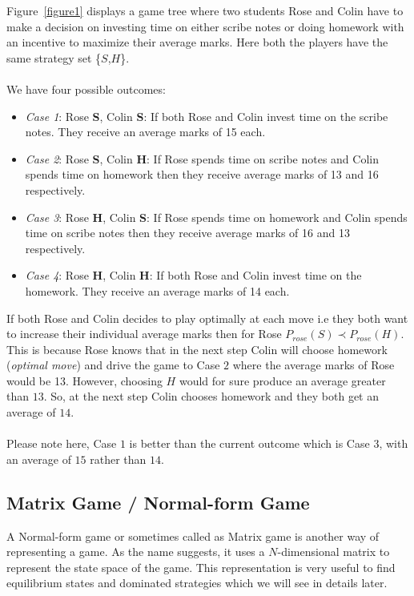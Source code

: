 Figure~\ref{figure1} displays a game tree where two students Rose and Colin have to make a decision on investing time on either scribe notes or doing homework with an incentive to maximize their average marks. Here both the players have the same strategy set \{$S$,$H$\}. \\\\We have four possible outcomes:\\
\begin{itemize}
    \item \textit{Case 1}: Rose \textbf{S}, Colin \textbf{S}: If both Rose and Colin invest time on the scribe notes. They receive an average marks of 15 each.
    \item \textit{Case 2}: Rose \textbf{S}, Colin \textbf{H}: If Rose spends time on scribe notes and Colin spends time on homework then they receive average marks of 13 and 16 respectively.
    \item \textit{Case 3}: Rose \textbf{H}, Colin \textbf{S}: If Rose spends time on homework and Colin spends time on scribe notes then they receive average marks of 16 and 13 respectively.
    \item \textit{Case 4}: Rose \textbf{H}, Colin \textbf{H}: If both Rose and Colin invest time on the homework. They receive an average marks of 14 each.
\end{itemize}If both Rose and Colin decides to play optimally at each move i.e they both want to increase their individual average marks then for Rose $P_{rose}(S) \prec P_{rose}(H)$. This is because Rose knows that in the next step Colin will choose homework (\textit{optimal move}) and drive the game to Case $2$ where the average marks of Rose would be 13. However, choosing $H$ would for sure produce an average greater than $13$. So, at the next step Colin chooses homework and they both get an average of $14$.\\\\
Please note here, Case $1$ is better than the current outcome which is Case $3$, with an average of $15$ rather than $14$.  
\subsection{Matrix Game / Normal-form Game}
A Normal-form game or sometimes called as Matrix game is another way of representing a game. As the name suggests, it uses a $N$-dimensional matrix to represent the state space of the game. This representation is very useful to find equilibrium states and dominated strategies which we will see in details later.

